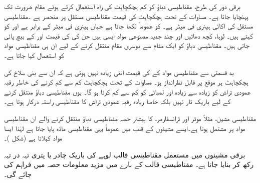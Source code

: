 برقی دور کی طرح، مقناطیسی دباؤ کو کم ہچکچاہٹ کی راہ استعمال کرتے ہوئے مقام ضرورت تک پہنچایا جاتا ہے۔ مساوات    کے تحت  ہچکچاہٹ کی قیمت  مقناطیسی مستقل  پر منحصر ہے ۔مقناطیسی مستقل کی اکائی   ہینری فی میٹر  ہے۔ کو عموماً  لکھا جاتا ہے جہاں   ہینری فی میٹر کے برابر ہے اور  کو  کہتے ہیں۔ لوہا،  کچھ دھاتیں اور چند جدید مصنوعی مواد  ایسی ہیں جن کی  کی قیمت  اور  کے  بیچ پائی جاتی ہیں۔ مقناطیسی دباؤ کو  ایک مقام سے دوسری مقام منتقل کرنے کے لیے ان ہی مقناطیسی مواد کو  استعمال کیا جاتا ہے۔

 بد قسمتی سے  مقناطیسی مواد کے   کی قیمت اتنی زیادہ  نہیں ہوتی ہے کہ ان سے بنی سلاخ کی ہچکچاہٹ ہر موقع پر قابل نظرانداز ہو۔ مساوات   کے تحت  ہچکچاہٹ کم سے کم کرنے کی خاطر رقبہ عمودی تراش کو زیادہ سے زیادہ اور لمبائی کو کم سے کم  کرنا ہو گا۔ یوں مقناطیسی دباؤ منتقل کرنے کے لیے  باریک تار نہیں بلکہ خاصا زیادہ رقبہ عمودی تراش کا مقناطیسی راستہ  درکار ہوتا ہے۔

مقناطیسی مشین، مثلاً موٹر اور ٹرانسفارمر، کا بیشتر حصہ مقناطیسی دباؤ منتقل کرنے والے ان مقناطیسی مواد  پر مشتمل ہوتا ہے۔ایسے مشینوں کے قلب میں عموماً یہی مقناطیسی مادّہ پایا جاتا ہے لہٰذا ایسا مواد   کہلاتا ہے (شکل )۔

برقی مشینوں میں مستعمل  مقناطیسی قالب لوہے کی باریک چادر یا پتری  تہہ  در تہہ رکھ کر بنایا جاتا ہے۔ مقناطیسی قالب کے بارے میں مزید معلومات حصہ   میں  فراہم کی جائے گی۔

